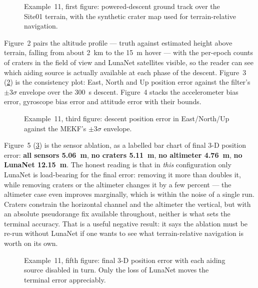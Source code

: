 \begin{figure}[htbp]
  \centering
  \caption{Example~11, first figure: powered-descent ground track over the
           Site01 terrain, with the synthetic crater map used for
           terrain-relative navigation.}
  \label{fig:tut-ex11-track}
\end{figure}

Figure~2 pairs the altitude profile --- truth against estimated height above
terrain, falling from about \SI{2}{\kilo\meter} to the \SI{15}{\meter} hover ---
with the per-epoch counts of craters in the field of view and LunaNet satellites
visible, so the reader can see which aiding source is actually available at each
phase of the descent. Figure~3 (\cref{fig:tut-ex11-err}) is the consistency
plot: East, North and Up position error against the filter's $\pm3\sigma$
envelope over the \SI{300}{\second} descent. Figure~4 stacks the accelerometer
bias error, gyroscope bias error and attitude error with their bounds.

\begin{figure}[htbp]
  \centering
  \caption{Example~11, third figure: descent position error in East/North/Up
           against the MEKF's $\pm3\sigma$ envelope.}
  \label{fig:tut-ex11-err}
\end{figure}

Figure~5 (\cref{fig:tut-ex11-ablation}) is the sensor ablation, as a labelled
bar chart of final 3-D position error: \textbf{all sensors
\SI{5.06}{\meter}}, \textbf{no craters \SI{5.11}{\meter}}, \textbf{no altimeter
\SI{4.76}{\meter}}, \textbf{no LunaNet \SI{12.15}{\meter}}. The honest reading
is that in \emph{this} configuration only LunaNet is load-bearing for the final
error: removing it more than doubles it, while removing craters or the altimeter
changes it by a few percent --- the altimeter case even improves marginally,
which is within the noise of a single run. Craters constrain the horizontal
channel and the altimeter the vertical, but with an absolute pseudorange fix
available throughout, neither is what sets the terminal accuracy. That is a
useful negative result: it says the ablation must be re-run without LunaNet if
one wants to see what terrain-relative navigation is worth on its own.

\begin{figure}[htbp]
  \centering
  \caption{Example~11, fifth figure: final 3-D position error with each aiding
           source disabled in turn. Only the loss of LunaNet moves the terminal
           error appreciably.}
  \label{fig:tut-ex11-ablation}
\end{figure}

